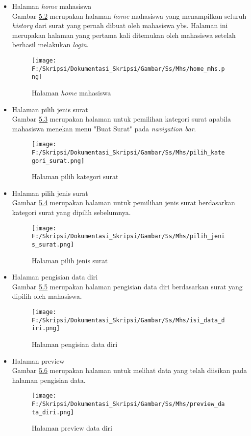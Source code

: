 \begin{itemize}
	\item Halaman \textit{home} mahasiswa\\
	 Gambar \hyperlink{halaman_home_mahasiswa}{5.2} merupakan halaman \textit{home} mahasiswa yang menampilkan seluruh \textit{history} dari surat yang pernah dibuat oleh mahasiswa ybs. Halaman ini merupakan halaman yang pertama kali ditemukan oleh mahasiswa setelah berhasil melakukan \textit{login}.
	 \begin{figure}[H]
	\centering
		\texttt{[image: F:/Skripsi/Dokumentasi\_Skripsi/Gambar/Ss/Mhs/home\_mhs.png]}
		\caption{Halaman \textit{home} mahasiswa}
		\label{fig:halaman_home_mahasiswa}
	\end{figure}
	
	\item Halaman pilih jenis surat\\
	Gambar \hyperlink{halaman_pilih_kategori_surat}{5.3} merupakan halaman untuk pemilihan kategori surat apabila mahasiswa menekan menu "Buat Surat" pada \textit{navigation bar}.
	\begin{figure}[H]
	\centering
		\texttt{[image: F:/Skripsi/Dokumentasi\_Skripsi/Gambar/Ss/Mhs/pilih\_kategori\_surat.png]}
		\caption{Halaman pilih kategori surat}
		\label{fig:halaman_pilih_kategori_surat}
	\end{figure}
	
	 \item Halaman pilih jenis surat\\
	Gambar \hyperlink{halaman_pilih_jenis_surat}{5.4} merupakan halaman untuk pemilihan jenis surat berdasarkan kategori surat yang dipilih sebelumnya.
	\begin{figure}[H]
	\centering
		\texttt{[image: F:/Skripsi/Dokumentasi\_Skripsi/Gambar/Ss/Mhs/pilih\_jenis\_surat.png]}
		\caption{Halaman pilih jenis surat}
		\label{fig:halaman_pilih_jenis_surat}
	\end{figure}
	
	\item Halaman pengisian data diri\\
	Gambar \hyperlink{halaman_pengisian_data_diri}{5.5} merupakan halaman pengisian data diri berdasarkan surat yang dipilih oleh mahasiswa.
	\begin{figure}[H]
	\centering
		\texttt{[image: F:/Skripsi/Dokumentasi\_Skripsi/Gambar/Ss/Mhs/isi\_data\_diri.png]}
		\caption{Halaman pengisian data diri}
		\label{fig:halaman_pengisian_data_diri}
	\end{figure}
	
	\item Halaman preview\\
	Gambar \hyperlink{halaman_preview_data_diri}{5.6} merupakan halaman untuk melihat data yang telah diisikan pada halaman pengisian data.
	\begin{figure}[H]
	\centering
		\texttt{[image: F:/Skripsi/Dokumentasi\_Skripsi/Gambar/Ss/Mhs/preview\_data\_diri.png]}
		\caption{Halaman preview data diri}
		\label{fig:halaman_preview_data_diri}
	\end{figure}
\end{itemize}


